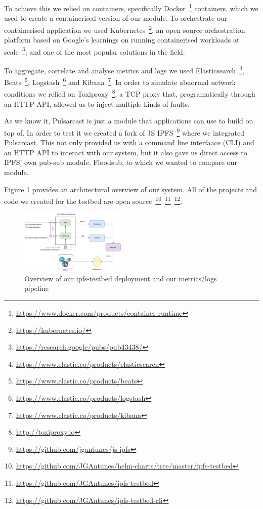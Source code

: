 To achieve this we relied on containers, specifically
Docker~\footnote{\url{https://www.docker.com/products/container-runtime}}
containers, which we used to create a containerised version of our module. To
orchestrate our containerised application we used
Kubernetes~\footnote{\url{https://kubernetes.io/}}, an open source
orchestration platform based on Google's learnings on running containerised
workloads at scale~\footnote{\url{https://research.google/pubs/pub43438/}}, and
one of the most popular solutions in the field.

To aggregate, correlate and analyse metrics and logs we used
Elasticsearch~\footnote{\url{https://www.elastic.co/products/elasticsearch}},
Beats~\footnote{\url{https://www.elastic.co/products/beats}},
Logstash~\footnote{\url{https://www.elastic.co/products/logstash}} and
Kibana~\footnote{\url{https://www.elastic.co/products/kibana}}. In order to
simulate abnormal network conditions we relied on
Toxiproxy~\footnote{\url{http://toxiproxy.io}}, a TCP proxy that,
programatically through an HTTP API, allowed us to inject multiple kinds of
faults.

As we know it, Pulsarcast is just a module that applications can use to build
on top of. In order to test it we created a fork of JS
IPFS~\footnote{\url{https://github.com/jgantunes/js-ipfs}} where we integrated
Pulsarcast. This not only provided us with a command line interfaace (CLI) and
an HTTP API to interact with our system, but it also gave us direct access to
IPFS' own pub-sub module, Floodsub, to which we wanted to compare our module.

Figure \ref{fig:ipfs-testbed-and-metrics} provides an architectural overview of
our system. All of the projects and code we created for the testbed are
open
source~\footnote{\url{https://github.com/JGAntunes/helm-charts/tree/master/ipfs-testbed}}~\footnote{\url{https://github.com/JGAntunes/ipfs-testbed}}~\footnote{\url{https://github.com/JGAntunes/ipfs-testbed-cli}}.

\begin{figure}[!htb]
  \centering
  \includegraphics[width=0.45\textwidth]{../images/ipfs-testbed-and-metrics.png}
  \caption{Overview of our ipfs-testbed deployment and our metrics/logs
  pipeline}
  \label{fig:ipfs-testbed-and-metrics}
\end{figure}

